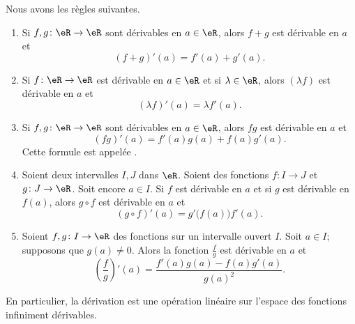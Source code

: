 \begin{proposition}        \label{PROPooOUZOooEcYKxn}
	Nous avons les règles suivantes.
	\begin{enumerate}
		\item       \label{ITEMooTFNPooYngHnD}
		      Si \( f,g\colon \eR\to \eR\) sont dérivables en \( a\in \eR\), alors \( f+g\) est dérivable en \( a\) et
		      \begin{equation}
			      (f+g)'(a)=f'(a)+g'(a).
		      \end{equation}
		\item       \label{ITEMooIPLRooOZXqMg}
		      Si \( f\colon \eR\to \eR\) est dérivable en \( a\in \eR\) et si \( \lambda\in \eR\), alors \( (\lambda f)\) est dérivable en \( a\) et
		      \begin{equation}
			      (\lambda f)'(a)=\lambda f'(a).
		      \end{equation}
		\item       \label{ITEMooMQERooBCqnvS}
		      Si \( f,g\colon \eR\to \eR\) sont dérivables en \( a\in \eR\), alors \( fg\) est dérivable en \( a\) et
		      \begin{equation}
			      (fg)'(a)=f'(a)g(a)+f(a)g'(a).
		      \end{equation}
		      Cette formule est appelée .
		\item       \label{ITEMooLYZCooVUPTyh}
		      Soient deux intervalles \( I,J\) dans \( \eR\). Soient des fonctions \( f\colon I\to J\) et \( g\colon J\to \eR\). Soit encore \( a\in I\). Si \( f\) est dérivable en \( a\) et si \( g\) est dérivable en \( f(a)\), alors \( g\circ f\) est dérivable en \( a\) et
		      \begin{equation}
			      (g\circ f)'(a)= g'\big( f(a) \big)f'(a).
		      \end{equation}
		\item       \label{ITEMooMUNQooLiKffz}
		      Soient \( f,g\colon I\to \eR\) des fonctions sur un intervalle ouvert \( I\). Soit \( a\in I\); supposons que \( g(a)\neq 0\). Alors la fonction \( \frac{ f }{ g }\) est dérivable en \( a\) et
		      \begin{equation}
			      \left( \frac{ f }{ g } \right)'(a)=\frac{ f'(a)g(a)-f(a)g'(a) }{ g(a)^2 }.
		      \end{equation}
	\end{enumerate}
	En particulier, la dérivation est une opération linéaire sur l'espace des fonctions infiniment dérivables.
\end{proposition}

